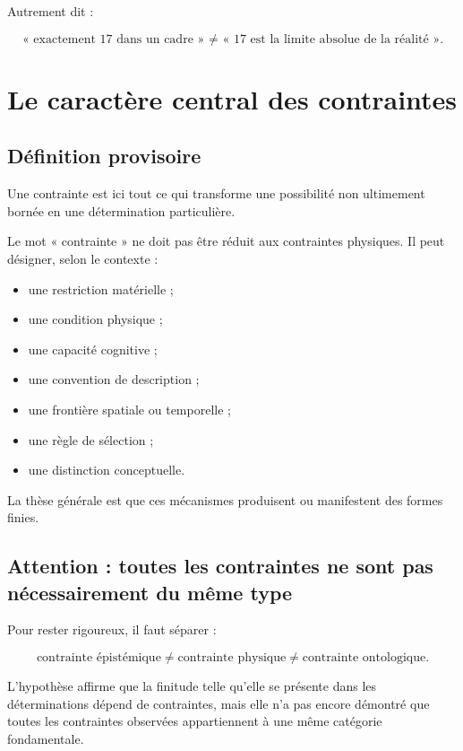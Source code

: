 \documentclass[11pt,a4paper]{article}
\begin{document}
Autrement dit :

\[
\boxed{
\text{« exactement 17 dans un cadre » } \neq \text{ « 17 est la limite absolue de la réalité ».}
}
\]

\section{Le caractère central des contraintes}

\subsection{Définition provisoire}

Une contrainte est ici tout ce qui transforme une possibilité non ultimement bornée en une détermination particulière.

Le mot « contrainte » ne doit pas être réduit aux contraintes physiques. Il peut désigner, selon le contexte :

\begin{itemize}
    \item une restriction matérielle ;
    \item une condition physique ;
    \item une capacité cognitive ;
    \item une convention de description ;
    \item une frontière spatiale ou temporelle ;
    \item une règle de sélection ;
    \item une distinction conceptuelle.
\end{itemize}

La thèse générale est que ces mécanismes produisent ou manifestent des formes finies.

\subsection{Attention : toutes les contraintes ne sont pas nécessairement du même type}

Pour rester rigoureux, il faut séparer :

\[
\text{contrainte épistémique} \neq \text{contrainte physique} \neq \text{contrainte ontologique}.
\]

L'hypothèse affirme que la finitude telle qu'elle se présente dans les déterminations dépend de contraintes, mais elle n'a pas encore démontré que toutes les contraintes observées appartiennent à une même catégorie fondamentale.
\end{document}
